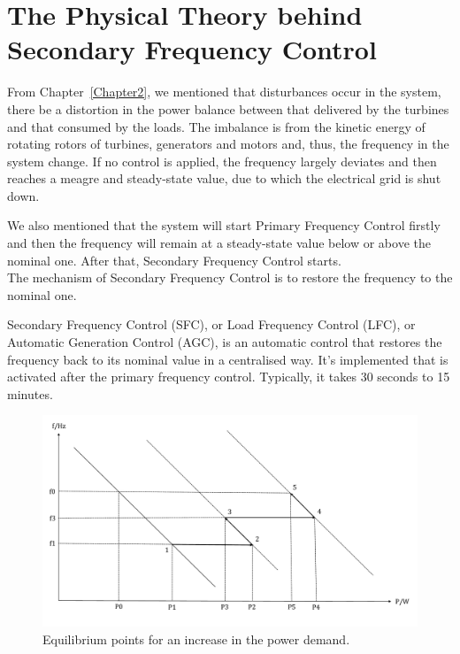 \section{The Physical Theory behind Secondary Frequency Control} %

From Chapter~\ref{Chapter2}, we mentioned that disturbances occur in the system, there be a distortion in the power balance between that delivered by the turbines and that consumed by the loads. The imbalance is from the kinetic energy of rotating rotors of turbines, generators and motors and, thus, the frequency in the system change. If no control is applied, the frequency largely deviates and then reaches a meagre and steady-state value, due to which the electrical grid is shut down.  

We also mentioned that the system will start Primary Frequency Control firstly and then the frequency will remain at a steady-state value below or above the nominal one. After that, Secondary Frequency Control starts.\\

The mechanism of Secondary Frequency Control is to restore the frequency to the nominal one. 

Secondary Frequency Control (SFC), or Load Frequency Control (LFC), or Automatic Generation Control (AGC), is an automatic control that \cite{machowski2011power} restores the frequency back to its nominal value in a centralised way. It's implemented that is activated after the primary frequency control. Typically, it takes 30 seconds to 15 minutes. 

\begin{figure}[t]
\center
\includegraphics[scale=0.4]{figure/3_1_Equilibrium.pdf}
\caption{Equilibrium points for an increase in the power demand.}
\label{3_1_Equilibrium}
\end{figure}

